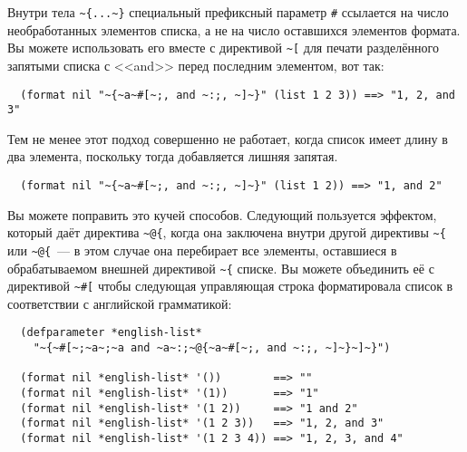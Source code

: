 Внутри тела \lstinline!~{...~}! специальный префиксный параметр \lstinline!#! ссылается на число необработанных элементов списка, а
не на число оставшихся элементов формата. Вы можете использовать его вместе с директивой \lstinline!~[! для печати
разделённого запятыми списка с <<and>> перед последним элементом, вот так:

\begin{verbatim}
  (format nil "~{~a~#[~;, and ~:;, ~]~}" (list 1 2 3)) ==> "1, 2, and 3"
\end{verbatim}

Тем не менее этот подход совершенно не работает, когда список имеет длину в два элемента,
поскольку тогда добавляется лишняя запятая.

\begin{verbatim}
  (format nil "~{~a~#[~;, and ~:;, ~]~}" (list 1 2)) ==> "1, and 2"
\end{verbatim}

Вы можете поправить это кучей способов. Следующий пользуется эффектом, который даёт директива \lstinline!~@{!, когда она
заключена внутри другой директивы \lstinline!~{! или \lstinline!~@{!~--- в этом случае она перебирает все элементы, оставшиеся в
обрабатываемом внешней директивой \lstinline!~{! списке. Вы можете объединить её с директивой \lstinline!~#[! чтобы следующая
управляющая строка форматировала список в соответствии с английской грамматикой:

\begin{verbatim}
  (defparameter *english-list*
    "~{~#[~;~a~;~a and ~a~:;~@{~a~#[~;, and ~:;, ~]~}~]~}")

  (format nil *english-list* '())        ==> ""
  (format nil *english-list* '(1))       ==> "1"
  (format nil *english-list* '(1 2))     ==> "1 and 2"
  (format nil *english-list* '(1 2 3))   ==> "1, 2, and 3"
  (format nil *english-list* '(1 2 3 4)) ==> "1, 2, 3, and 4"
\end{verbatim}

